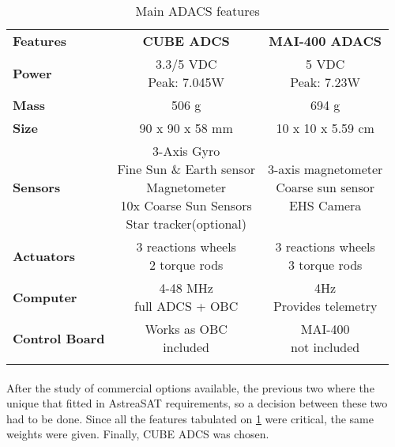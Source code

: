 \begin{longtable}{| l | c | c |}
	
	\hline
	\rowcolor[gray]{0.60} \multicolumn{3}{|c|}{\textbf{ADACS options }} \\
	\hline
	
	\hline
	\rowcolor[gray]{0.75}	\textbf{Features} &  \textbf{CUBE ADCS} & \textbf{MAI-400 ADACS} \\
	\hline
	
	\cellcolor[gray]{0.85} \textbf{Power} &\makecell{3.3/5 VDC\\ Peak: 7.045W }&  \makecell{5 VDC\\Peak: 7.23W}  \\ 	\hline
	\cellcolor[gray]{0.85} \textbf{Mass} & 506 g& 694 g\\ \hline
	\cellcolor[gray]{0.85} \textbf{Size} & 90 x 90 x 58 mm&10 x 10 x 5.59 cm \\ \hline
	\cellcolor[gray]{0.85} \textbf{Sensors} & \makecell{3-Axis Gyro\\Fine Sun \& Earth sensor \\ Magnetometer\\10x Coarse Sun Sensors \\Star tracker(optional)}& \makecell{3-axis magnetometer \\Coarse sun sensor\\EHS Camera}\\ 	\hline
	\cellcolor[gray]{0.85} \textbf{Actuators} &  \makecell{3 reactions wheels\\2 torque rods} & \makecell{3 reactions wheels\\3 torque rods}\\ 	\hline
	\cellcolor[gray]{0.85} \textbf{Computer} &\makecell{4-48 MHz\\ full ADCS + OBC}  & \makecell{4Hz\\Provides telemetry}\\ \hline
	\cellcolor[gray]{0.85} \textbf{Control Board} & \makecell{Works as OBC\\included}& \makecell{MAI-400\\ not included}\\
	\hline
	
	\caption{Main ADACS features}
	\label{ADACS}
	
\end{longtable}

\paragraph{}  After the study of commercial options available, the previous two where the unique that fitted in AstreaSAT requirements, so a decision between these two had to be done. Since all the features tabulated on \ref{ADACS} were critical, the same weights were given. Finally, CUBE ADCS was chosen.\\
